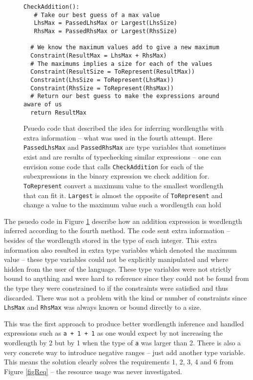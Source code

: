 \begin{figure}
\begin{verbatim}
CheckAddition():
   # Take our best guess of a max value
   LhsMax = PassedLhsMax or Largest(LhsSize)
   RhsMax = PassedRhsMax or Largest(RhsSize)

  # We know the maximum values add to give a new maximum
  Constraint(ResultMax = LhsMax + RhsMax)
  # The maximums implies a size for each of the values
  Constraint(ResultSize = ToRepresent(ResultMax))
  Constraint(LhsSize = ToRepresent(LhsMax))
  Constraint(RhsSize = ToRepresent(RhsMax))
  # Return our best guess to make the expressions around aware of us
  return ResultMax
\end{verbatim}
  \cprotect\caption{Psuedo code that described the idea for inferring wordlengths with extra information -- what was used in the fourth attempt. Here \verb+PassedLhsMax+ and \verb+PassedRhsMax+ are type variables that sometimes exist and are results of typechecking similar expressions -- one can envision some code that calls \verb+CheckAddition+ for each of the subexpressions in the binary expression we check addition for. \verb+ToRepresent+ convert a maximum value to the smallest wordlength that can fit it. \verb+Largest+ is almost the opposite of \verb+ToRepresent+ and change a value to the maximum value such a wordlength can hold}
\label{fig:psuedoFour}
\end{figure}

The psuedo code in Figure \ref{fig:psuedoFour} describe how an addition expression is wordlength inferred according to the fourth method. The code sent extra information -- besides of the wordlength stored in the type of each integer. This extra information also resulted in extra type variables which denoted the maximum value -- these type variables could not be explicitly manipulated and where hidden from the user of the language. These type variables were not strictly bound to anything and were hard to reference since they could not be found from the type they were constrained to if the constraints were satisfied and thus discarded. There was not a problem with the kind or number of constraints since \verb+LhsMax+ and \verb+RhsMax+ was always known or bound directly to a size.

This was the first approach to produce better wordlength inference and handled expressions such as \verb!a + 1 + 1! as one would expect by not increasing the wordlength by 2 but by 1 when the type of \verb+a+ was larger than 2. There is also a very concrete way to introduce negative ranges -- just add another type variable. This means the solution clearly solves the requirements 1, 2, 3, 4 and 6 from Figure \ref{figReq} -- the resource usage was never investigated.


